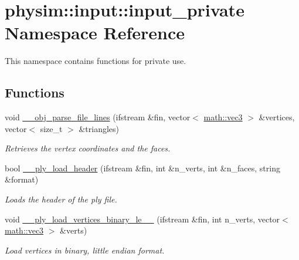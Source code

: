 \hypertarget{namespacephysim_1_1input_1_1input__private}{}\section{physim\+:\+:input\+:\+:input\+\_\+private Namespace Reference}
\label{namespacephysim_1_1input_1_1input__private}


This namespace contains functions for private use.  


\subsection*{Functions}
\begin{DoxyCompactItemize}
\item 
void \hyperlink{namespacephysim_1_1input_1_1input__private_a9bf525ab1bb178cfe1de59c6a91b6554}{\+\_\+\+\_\+obj\+\_\+parse\+\_\+file\+\_\+lines} (ifstream \&fin, vector$<$ \hyperlink{structphysim_1_1math_1_1vec3}{math\+::vec3} $>$ \&vertices, vector$<$ size\+\_\+t $>$ \&triangles)
\begin{DoxyCompactList}\small\item\em Retrieves the vertex coordinates and the faces. \end{DoxyCompactList}\item 
bool \hyperlink{namespacephysim_1_1input_1_1input__private_a9621d3648a479a8b35a221aac2c1b619}{\+\_\+\+\_\+ply\+\_\+load\+\_\+header} (ifstream \&fin, int \&n\+\_\+verts, int \&n\+\_\+faces, string \&format)
\begin{DoxyCompactList}\small\item\em Loads the header of the ply file. \end{DoxyCompactList}\item 
\mbox{\label{namespacephysim_1_1input_1_1input__private_aa74f98e62f9523f70b544142b293c6f3}} 
void \hyperlink{namespacephysim_1_1input_1_1input__private_aa74f98e62f9523f70b544142b293c6f3}{\+\_\+\+\_\+ply\+\_\+load\+\_\+vertices\+\_\+binary\+\_\+le\+\_\+\_} (ifstream \&fin, int n\+\_\+verts, vector$<$ \hyperlink{structphysim_1_1math_1_1vec3}{math\+::vec3} $>$ \&verts)
\begin{DoxyCompactList}\small\item\em Load vertices in binary, little endian format. \end{DoxyCompactList}\item 

\end{DoxyCompactItemize}
